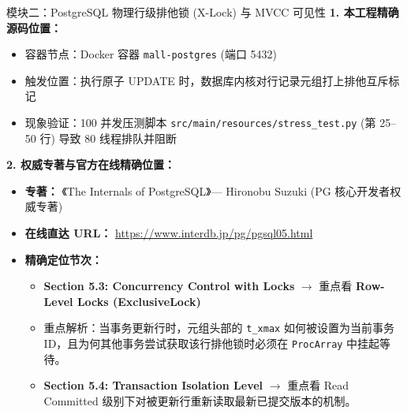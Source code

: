 \documentclass[a4paper,10pt]{ctexart}
\begin{document}
\vspace{0.2cm}

\begin{curriculumbox}{模块二：PostgreSQL 物理行级排他锁 (X-Lock) 与 MVCC 可见性}
\textbf{1. 本工程精确源码位置：}
\begin{itemize}[leftmargin=1.2cm, noitemsep]
    \item 容器节点：Docker 容器 \texttt{mall-postgres} (端口 5432)
    \item 触发位置：执行原子 UPDATE 时，数据库内核对行记录元组打上排他互斥标记
    \item 现象验证：100 并发压测脚本 \texttt{src/main/resources/stress\_test.py} (第 25--50 行) 导致 80 线程排队并阻断
\end{itemize}

\textbf{2. 权威专著与官方在线精确位置：}
\begin{itemize}[leftmargin=1.2cm, noitemsep]
    \item \textbf{专著：} 《The Internals of PostgreSQL》--- Hironobu Suzuki (PG 核心开发者权威专著)
    \item \textbf{在线直达 URL：} \url{https://www.interdb.jp/pg/pgsql05.html}
    \item \textbf{精确定位节次：}
    \begin{itemize}
        \item \textbf{Section 5.3: Concurrency Control with Locks} $\rightarrow$ 重点看 \textbf{Row-Level Locks (ExclusiveLock)}
        \item 重点解析：当事务更新行时，元组头部的 \texttt{t\_xmax} 如何被设置为当前事务 ID，且为何其他事务尝试获取该行排他锁时必须在 \texttt{ProcArray} 中挂起等待。
        \item \textbf{Section 5.4: Transaction Isolation Level} $\rightarrow$ 重点看 Read Committed 级别下对被更新行重新读取最新已提交版本的机制。
    \end{itemize}
\end{itemize}
\end{curriculumbox}

\vspace{0.2cm}
\end{document}
